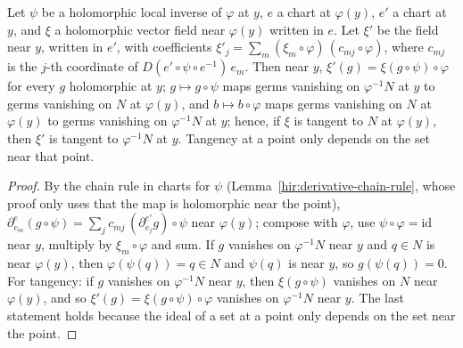 \begin{lemma}
\label{mc:field-transfer}
\leanok
Let \(\psi\) be a holomorphic local inverse of \(\varphi\) at \(y\), \(e\) a chart at \(\varphi(y)\), \(e'\) a chart at \(y\), and \(\xi\) a holomorphic vector field near
\(\varphi(y)\) written in \(e\). Let \(\xi'\) be the field near \(y\), written in \(e'\), with coefficients \(\xi'_j=\sum_m(\xi_m\circ\varphi)\,(c_{mj}\circ\varphi)\), where
\(c_{mj}\) is the \(j\)-th coordinate of \(D(e'\circ\psi\circ e^{-1})\,e_m\). Then near \(y\), \(\xi'(g)=\xi(g\circ\psi)\circ\varphi\) for every \(g\) holomorphic at \(y\);
\(g\mapsto g\circ\psi\) maps germs vanishing on \(\varphi^{-1}N\) at \(y\) to germs vanishing on \(N\) at \(\varphi(y)\), and \(b\mapsto b\circ\varphi\) maps germs vanishing on \(N\)
at \(\varphi(y)\) to germs vanishing on \(\varphi^{-1}N\) at \(y\); hence, if \(\xi\) is tangent to \(N\) at \(\varphi(y)\), then \(\xi'\) is tangent to \(\varphi^{-1}N\) at \(y\).
Tangency at a point only depends on the set near that point.
\end{lemma}
\begin{proof}
\leanok
By the chain rule in charts for \(\psi\) (Lemma~\ref{hir:derivative-chain-rule}, whose proof only uses that the map is holomorphic near the point),
\(\partial^e_{e_m}(g\circ\psi)=\sum_jc_{mj}\,(\partial^{e'}_{e_j}g)\circ\psi\) near \(\varphi(y)\); compose with \(\varphi\), use \(\psi\circ\varphi=\mathrm{id}\) near \(y\), multiply by
\(\xi_m\circ\varphi\) and sum. If \(g\) vanishes on \(\varphi^{-1}N\) near \(y\) and \(q\in N\) is near \(\varphi(y)\), then \(\varphi(\psi(q))=q\in N\) and \(\psi(q)\) is near \(y\),
so \(g(\psi(q))=0\). For tangency: if \(g\) vanishes on \(\varphi^{-1}N\) near \(y\), then \(\xi(g\circ\psi)\) vanishes on \(N\) near \(\varphi(y)\), and so
\(\xi'(g)=\xi(g\circ\psi)\circ\varphi\) vanishes on \(\varphi^{-1}N\) near \(y\). The last statement holds because the ideal of a set at a point only depends on
the set near the point.
\end{proof}

